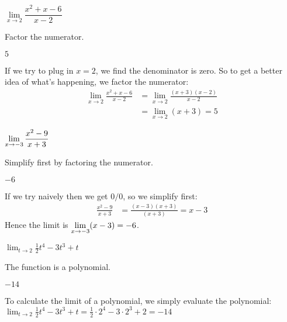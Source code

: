 \begin{question}[2007H]
$\lim\limits_{x\rightarrow 2}\dfrac{x^2+x-6}{x-2}$
\end{question}
\begin{hint} Factor the numerator.
\end{hint}
\begin{answer}
$5$
\end{answer}
\begin{solution}
If we try to plug in $x=2$, we find the denominator is zero. So to get a better idea of what's happening, we factor the numerator:
\begin{align*}
\lim\limits_{x\rightarrow 2}\frac{x^2+x-6}{x-2}&=
\lim\limits_{x\rightarrow 2}\frac{(x+3)(x-2)}{x-2}\\&=
\lim\limits_{x\rightarrow 2}(x+3)=5
\end{align*}
\end{solution}




\begin{question}[2015Q]
$\displaystyle \lim_{x \to -3} \frac{x^2-9}{x+3}$
\end{question}
\begin{hint}
Simplify first by factoring the numerator.
\end{hint}
\begin{answer}
$-6$
\end{answer}
\begin{solution}
If we try naively then we get $0/0$, so we simplify first:
\begin{align*}
  \frac{x^2-9}{x+3} &= \frac{(x-3)(x+3)}{(x+3)} = x-3
\end{align*}
Hence the limit is $\displaystyle \lim_{x\to-3} (x-3) = -6$.
\end{solution}


\begin{question}
$\displaystyle\lim_{t \rightarrow 2} \frac{1}{2}t^4-3t^3+t$
\end{question}
\begin{hint} The function is a polynomial.
\end{hint}
\begin{answer} $-14$
\end{answer}
\begin{solution} To calculate the limit of a polynomial, we simply evaluate the polynomial:\\
$\displaystyle\lim_{t \rightarrow 2} \frac{1}{2}t^4-3t^3+t
=
\frac{1}{2}\cdot2^4-3\cdot 2^3+2 = -14$
\end{solution}

